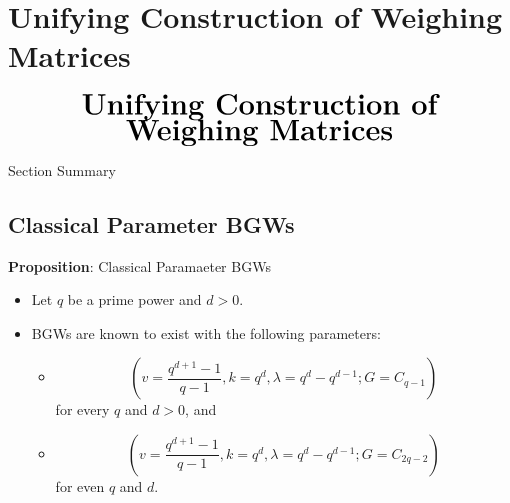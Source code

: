 \documentclass{beamer}
\begin{document}

\section{Unifying Construction of Weighing Matrices}

\begin{frame}
  \[
    \begin{array}{c}
      \text{\huge\bf Unifying Construction of}
      \\
      \text{\huge\bf Weighing Matrices}
    \end{array}
  \]
\end{frame}

\begin{frame}{Section Summary}
  \tableofcontents[sections={3}]
\end{frame}


\subsection{Classical Parameter BGWs}

\begin{frame}

  \begin{block}{{\bf Proposition}: Classical Paramaeter BGWs}
    \begin{itemize}
    \item Let $q$ be a prime power and $d>0$.
    \item BGWs are known to exist with the following parameters:
      \begin{itemize}
      \item
        \[
          \left(
            v = \frac{q^{d+1}-1}{q-1}, k = q^d, \lambda = q^d-q^{d-1}; G = C_{q-1}
          \right)
        \]
        for every $q$ and $d>0$, and
      \item
        \[
          \left(
            v = \frac{q^{d+1}-1}{q-1}, k = q^d, \lambda = q^d-q^{d-1}; G = C_{2q-2}
          \right)
        \]
        for even $q$ and $d$.
      \end{itemize}
    \end{itemize}
  \end{block}
  
\end{frame}
\end{document}
